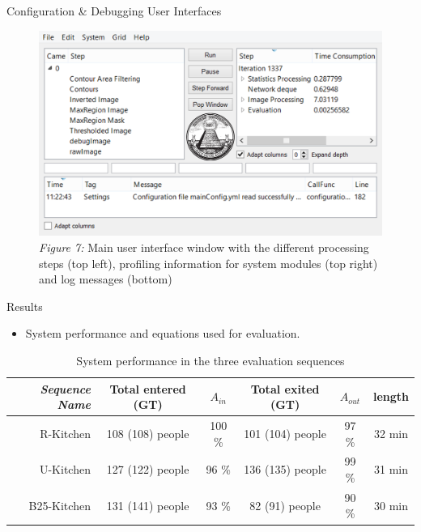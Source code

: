 \documentclass[final,hyperref={pdfpagelabels=false}]{beamer}
\begin{document}
\begin{frame}[t]
\begin{columns}[t]
\begin{column}{.465\textwidth}
\begin{block}{
\vspace*{-0.002\textheight}
Configuration \& Debugging User Interfaces
}
\begin{figure}
\includegraphics[width=0.9\linewidth]{PosterDebuggerLogo.png}
\caption{\centering \textit{Figure 7:} Main user interface window with the different processing steps (top left), profiling information for system modules (top right) and log messages (bottom)}
\end{figure}

\end{block}




\begin{block}{
\vspace*{-0.002\textheight}
Results
}

\begin{itemize}
\item System performance and equations used for evaluation.
\end{itemize}

\begin{table}[h]
\centering
	\begin{tabular}{r | c | c | c | c | c  }
		\emph{Sequence Name}		&  Total entered (GT) & \emph{$A_{in}$} & Total exited (GT) & \emph{$A_{out}$} & length \\
		\hline \hline
		R-Kitchen			& 108 (108) people & 100 \% & 101 (104) people & 97 \% & 32 min\\
		U-Kitchen			& 127 (122) people & 96 \% & 136 (135) people & 99 \% & 31 min  \\
		B25-Kitchen			& 131 (141) people & 93 \% & 82 (91) people & 90 \% & 30 min \\
		\end{tabular}
	\caption{System performance in the three evaluation sequences}
\end{table}




\end{block}
\end{column}
\end{columns}
\end{frame}
\end{document}
